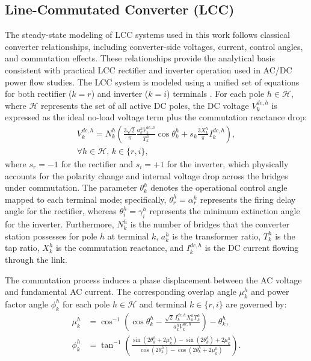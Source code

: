 \documentclass[letterpaper,journal]{IEEEtran}
\begin{document}
\subsection{Line-Commutated Converter (LCC)}
 The steady-state modeling of LCC systems used in this work follows classical converter relationships, including converter-side voltages,
 current, control angles, and commutation effects. These relationships provide the analytical basis consistent with practical LCC rectifier
 and inverter operation used in AC/DC power flow studies.
The LCC system is modeled using a unified set of equations for both rectifier ($k=r$) and inverter ($k=i$) terminals \cite{ref13}. For each
pole $h \in \mathcal{H}$, where $\mathcal{H}$ represents the set of all active DC poles, the DC voltage $V^{dc,h}_k$ is expressed as the ideal
no-load voltage term plus the commutation reactance drop:
\begin{align}
	\label{eq:vdc_universal}
	V^{dc,h}_k = N^h_k \left(\frac{3 \sqrt{2}}{\pi}\frac{a^h_k V^{ac,h}_k}{T^h_k} \cos{\theta^h_k} + s_k\frac{3 X^{h}_k}{\pi} I^{dc,h}_k\right), \nonumber \\
	\forall h \in \mathcal{H}, \, k \in \{r,i\},
\end{align}
where $s_r=-1$ for the rectifier and $s_i=+1$ for the inverter, which physically accounts for the polarity change and internal voltage drop across
the bridges under commutation. The parameter $\theta^h_k$ denotes the operational control angle mapped to each terminal mode;
specifically, $\theta^h_r = \alpha^h_r$ represents the firing delay angle for the rectifier, whereas $\theta^h_i = \gamma^h_i$ represents
the minimum extinction angle for the inverter. Furthermore, $N^h_k$ is the number of bridges that the converter station possesses for pole $h$
at terminal $k$, $a^h_k$ is the transformer ratio, $T^h_k$ is the tap ratio, $X^h_k$ is the commutation reactance, and $I^{dc,h}_k$ is the DC
current flowing through the link.

The commutation process induces a phase displacement between the AC voltage and fundamental AC current. The corresponding overlap angle $\mu^h_k$
and power factor angle $\phi^h_k$ for each pole $h \in \mathcal{H}$ and terminal $k \in \{r,i\}$ are governed by:
\begin{align}
	\label{eq:overlap_angle_fix}
	\mu^h_k  & = \cos^{-1}\left(\cos\theta^h_k-\frac{\sqrt{2}\,I^{dc,h}_k X^{h}_k T^h_k}{a^h_k V^{ac,h}_k}\right)-\theta^h_k, \\
	\label{eq:phi_angle_fix}
	\phi^h_k & = \tan^{-1}\left(
	\frac{\sin(2\theta^h_k+2\mu^h_k)-\sin(2\theta^h_k)+2\mu^h_k}
	{\cos(2\theta^h_k)-\cos(2\theta^h_k+2\mu^h_k)}
	\right).
\end{align}
\end{document}

